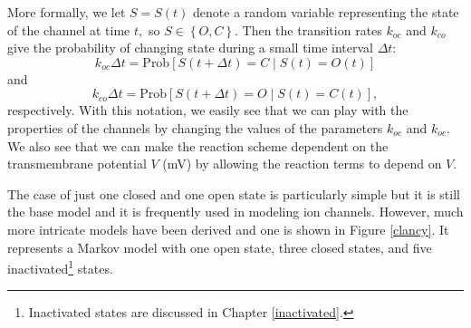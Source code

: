 More formally, we let $S=S(t)$ denote a random variable representing
the state of the channel at time $t,$ so $S\in\left\{  O,C\right\}  $. Then
the transition rates $k_{oc}$ and $k_{co}$ give the probability of changing
state during a small time interval $\Delta t:$%
\[
k_{oc}\Delta t=\text{Prob}\left[  S(t+\Delta t)=C\mid S(t)=O(t)\right]
\]
and%
\[
k_{co}\Delta t=\text{Prob}\left[  S(t+\Delta t)=O\mid S(t)=C(t)\right],
\]
respectively. With this notation, we easily see that we can play with the properties of the channels by changing the values of the parameters $ k_{oc}$ and  $k_{oc}$. We also see that we can make the reaction scheme dependent on the transmembrane potential $V$  (mV) by allowing the reaction terms to depend on $V.$


The case of just one closed and one open state is particularly simple but it is still the base model and it is frequently used in modeling ion channels. 
However, much more intricate models have been derived and one is shown in Figure \ref{clancy}. It represents a Markov model with one open state, three closed states, and five inactivated\footnote{Inactivated states are discussed in Chapter \ref{inactivated}.  } states.

